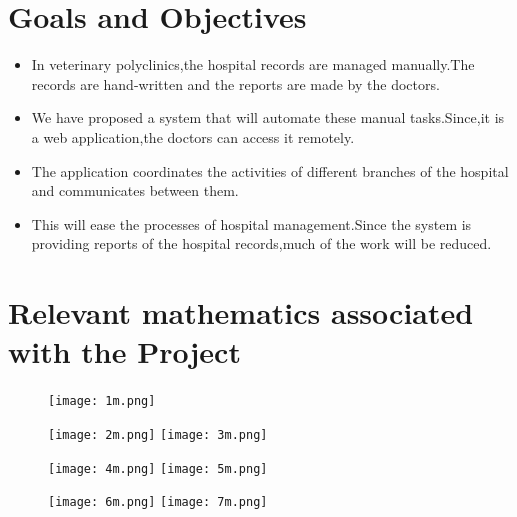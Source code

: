 \documentclass[oneside,a4paper,12pt]{book}
\begin{document}
\section{Goals and Objectives}
\begin{itemize}
	\item  In veterinary polyclinics,the hospital records are managed manually.The records are hand-written and the reports are made by the doctors.
	\item We have proposed a system that will automate these manual tasks.Since,it is a web application,the doctors can access it remotely.
	\item The application coordinates the activities of different branches of the hospital and communicates between them.
	\item This will ease the processes of hospital management.Since the system is providing  reports of the hospital records,much of the work will be reduced.
\end{itemize}

	
\section{Relevant mathematics associated with the Project}
\label{sec:math}

\begin{center}
	\begin{figure}[!htbp]
		\centering
		\texttt{[image: 1m.png]}
		
		
	  
	\end{figure}
\end{center} 

\begin{center}
	\begin{figure}[!htbp]
		\centering
		\texttt{[image: 2m.png]}
		\texttt{[image: 3m.png]}
		
		\end{figure}
\end{center} 

\begin{center}
	\begin{figure}[!htbp]
		\centering
		\texttt{[image: 4m.png]}
		\texttt{[image: 5m.png]}
		
		\end{figure}
\end{center} 

\begin{center}
	\begin{figure}[!htbp]
		\centering
		\texttt{[image: 6m.png]}
		\texttt{[image: 7m.png]}
		
		\end{figure}
\end{center} 
\end{document}
